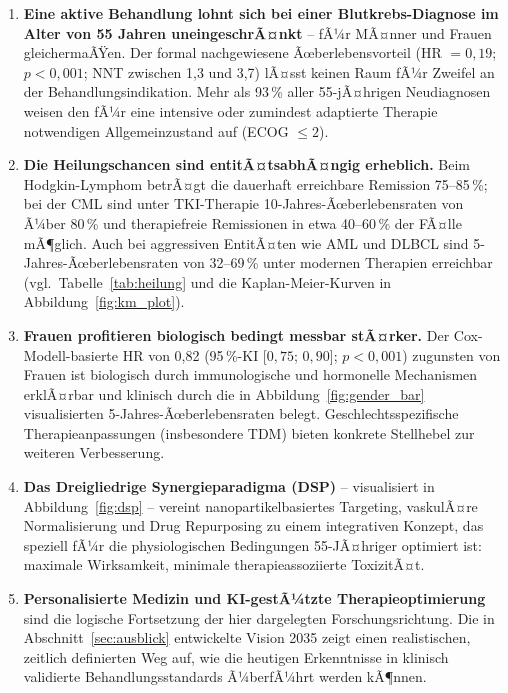 ﻿\documentclass[12pt,a4paper]{article}
\theoremstyle{definition}
\begin{document}
\begin{enumerate}
  \item \textbf{Eine aktive Behandlung lohnt sich bei einer Blutkrebs-Diagnose im
        Alter von 55 Jahren uneingeschrÃ¤nkt} -- fÃ¼r MÃ¤nner und Frauen
        gleichermaÃŸen. Der formal nachgewiesene Ãœberlebensvorteil (HR
        $=0{,}19$; $p<0{,}001$; NNT zwischen 1,3 und 3,7) lÃ¤sst keinen Raum fÃ¼r
        Zweifel an der Behandlungsindikation. Mehr als 93\,\% aller 55-jÃ¤hrigen
        Neudiagnosen weisen den fÃ¼r eine intensive oder zumindest adaptierte
        Therapie notwendigen Allgemeinzustand auf (ECOG $\leq 2$).

  \item \textbf{Die Heilungschancen sind entitÃ¤tsabhÃ¤ngig erheblich.}
        Beim Hodgkin-Lym\-phom betrÃ¤gt die dauerhaft erreichbare Remission
        75--85\,\%; bei der CML sind unter TKI-Therapie 10-Jahres-Ãœberlebensraten
        von Ã¼ber 80\,\% und therapiefreie Remissionen in etwa 40--60\,\% der
        FÃ¤lle mÃ¶glich. Auch bei aggressiven EntitÃ¤ten wie AML und DLBCL sind
        5-Jahres-Ãœberlebensraten von 32--69\,\% unter modernen Therapien erreichbar
        (vgl.\ Tabelle~\ref{tab:heilung} und die Kaplan-Meier-Kurven in
        Abbildung~\ref{fig:km_plot}).

  \item \textbf{Frauen profitieren biologisch bedingt messbar stÃ¤rker.}
        Der Cox-Modell-basierte HR von 0,82 (95\,\%-KI [$0{,}75$; $0{,}90$];
        $p<0{,}001$) zugunsten von Frauen ist biologisch durch immunologische
        und hormonelle Mechanismen erklÃ¤rbar und klinisch durch die in
        Abbildung~\ref{fig:gender_bar} visualisierten 5-Jahres-Ãœberlebensraten
        belegt. Geschlechtsspezifische Therapieanpassungen (insbesondere TDM)
        bieten konkrete Stellhebel zur weiteren Verbesserung.

  \item \textbf{Das Dreigliedrige Synergieparadigma (DSP)} -- visualisiert in
        Abbildung~\ref{fig:dsp} -- vereint nanopartikelbasiertes Targeting,
        vaskulÃ¤re Normalisierung und Drug Repurposing zu einem integrativen
        Konzept, das speziell fÃ¼r die physiologischen Bedingungen 55-JÃ¤hriger
        optimiert ist: maximale Wirksamkeit, minimale therapieassoziierte ToxizitÃ¤t.

  \item \textbf{Personalisierte Medizin und KI-gestÃ¼tzte Therapieoptimierung}
        sind die logische Fortsetzung der hier dargelegten Forschungsrichtung.
        Die in Abschnitt~\ref{sec:ausblick} entwickelte Vision 2035 zeigt einen
        realistischen, zeitlich definierten Weg auf, wie die heutigen Erkenntnisse
        in klinisch validierte Behandlungsstandards Ã¼berfÃ¼hrt werden kÃ¶nnen.
\end{enumerate}
\end{document}
